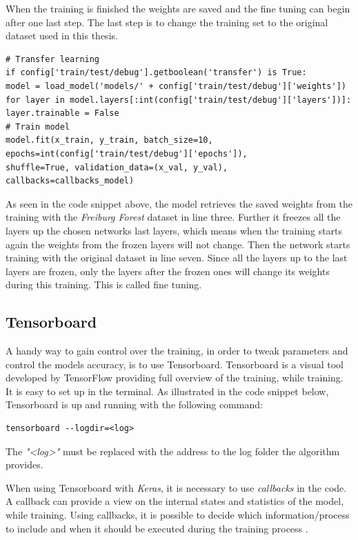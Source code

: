 \documentclass[USenglish]{ifimaster}  %
\begin{document}
When the training is finished the weights are saved and the fine tuning can begin after one last step. The last step is to change the training set to the original dataset used in this thesis.

\begin{verbatim}
# Transfer learning
if config['train/test/debug'].getboolean('transfer') is True:
model = load_model('models/' + config['train/test/debug']['weights'])
for layer in model.layers[:int(config['train/test/debug']['layers'])]:
layer.trainable = False
# Train model
model.fit(x_train, y_train, batch_size=10,
epochs=int(config['train/test/debug']['epochs']),
shuffle=True, validation_data=(x_val, y_val),
callbacks=callbacks_model)

\end{verbatim}
As seen in the code snippet above, the model retrieves the saved weights from the training with the \textit{Freiburg Forest} dataset in line three. Further it freezes all the layers up the chosen networks last layers, which means when the training starts again the weights from the frozen layers will not change. Then the network starts training with the original dataset in line seven. Since all the layers up to the last layers are frozen, only the layers after the frozen ones will change its weights during this training. This is called fine tuning. 

\subsection{Tensorboard}
A handy way to gain control over the training, in order to tweak parameters and control the models accuracy, is to use Tensorboard. Tensorboard is a visual tool developed by TensorFlow providing full overview of the training, while training. It is easy to set up in the terminal. As illustrated in the code snippet below, Tensorboard is up and running with the following command: 

\begin{verbatim}
tensorboard --logdir=<log> 
\end{verbatim}
The \textit{"<log>"} must be replaced with the address to the log folder the algorithm provides. 

When using Tensorboard with \textit{Keras}, it is necessary to use \textit{callbacks} in the code. A callback can provide a view on the internal states and statistics of the model, while training. Using callbacks, it is possible to decide which information/process to include and when it should be executed during the training process \cite{website:Keras_doc}.
\end{document}
